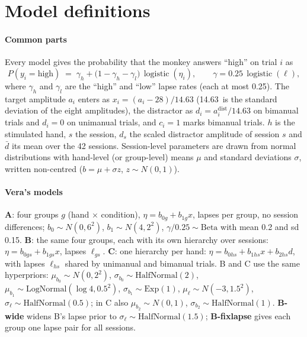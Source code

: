 \section{Model definitions}\label{app:models}

\paragraph{Common parts}
Every model gives the probability that the monkey answers ``high'' on trial $i$ as
\[
P(y_i=\text{high}) \;=\; \gamma_{h} + \bigl(1-\gamma_{h}-\gamma_{l}\bigr)\,\operatorname{logistic}(\eta_i),
\qquad \gamma = 0.25\,\operatorname{logistic}(\ell),
\]
where $\gamma_h$ and $\gamma_l$ are the ``high'' and ``low'' lapse rates (each at most 0.25).
The target amplitude $a_i$ enters as $x_i=(a_i-28)/14.63$ (14.63\um\ is the standard deviation of the eight amplitudes),
the distractor as $d_i=a^{\mathrm{dist}}_i/14.63$ on bimanual trials and $d_i=0$ on unimanual trials, and $c_i=1$ marks bimanual trials.
$h$ is the stimulated hand, $s$ the session, $d_s$ the scaled distractor amplitude of session $s$ and $\bar d$ its mean over the 42 sessions.
Session-level parameters are drawn from normal distributions with hand-level (or group-level) means $\mu$ and standard deviations $\sigma$, written non-centred ($b=\mu+\sigma z$, $z\sim N(0,1)$).

\paragraph{Vera's models}
\textbf{A}: four groups $g$ (hand $\times$ condition), $\eta=b_{0g}+b_{1g}x$, lapses per group, no session differences;
$b_0\sim N(0,6^2)$, $b_1\sim N(4,2^2)$, $\gamma/0.25\sim\mathrm{Beta}$ with mean 0.2 and sd 0.15.
\textbf{B}: the same four groups, each with its own hierarchy over sessions: $\eta=b_{0gs}+b_{1gs}x$, lapses $\ell_{gs}$.
\textbf{C}: one hierarchy per hand: $\eta=b_{0hs}+b_{1hs}x+b_{2hs}d$, with lapses $\ell_{hs}$ shared by unimanual and bimanual trials.
B and C use the same hyperpriors: $\mu_{b_0}\sim N(0,2^2)$, $\sigma_{b_0}\sim \mathrm{HalfNormal}(2)$,
$\mu_{b_1}\sim \mathrm{LogNormal}(\log 4, 0.5^2)$, $\sigma_{b_1}\sim \mathrm{Exp}(1)$, $\mu_{\ell}\sim N(-3,1.5^2)$, $\sigma_\ell\sim\mathrm{HalfNormal}(0.5)$; in C also $\mu_{b_2}\sim N(0,1)$, $\sigma_{b_2}\sim\mathrm{HalfNormal}(1)$.
\textbf{B-wide} widens B's lapse prior to $\sigma_\ell\sim\mathrm{HalfNormal}(1.5)$; \textbf{B-fixlapse} gives each group one lapse pair for all sessions.

